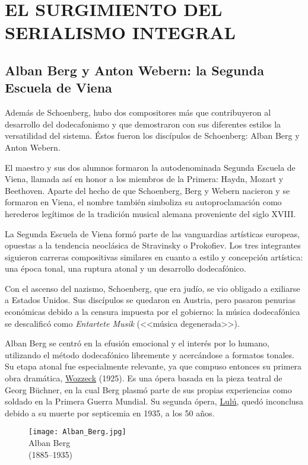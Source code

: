 \section{EL SURGIMIENTO DEL SERIALISMO INTEGRAL}\label{ch:serialismo}
	\subsection{Alban Berg y Anton Webern: la Segunda Escuela de Viena}
	\label{berweb}
	Además de Schoenberg, hubo dos compositores más que contribuyeron al desarrollo del dodecafonismo y que demostraron con sus diferentes estilos la versatilidad del sistema. Éstos fueron los discípulos de Schoenberg: Alban Berg y Anton Webern. 
	
	El maestro y sus dos alumnos formaron la autodenominada Segunda Escuela de Viena, llamada así en honor a los miembros de la Primera: Haydn, Mozart y Beethoven. Aparte del hecho de que Schoenberg, Berg y Webern nacieron y se formaron en Viena, el nombre también simboliza su autoproclamación como herederos legítimos de la tradición musical alemana proveniente del siglo XVIII.
	
	La Segunda Escuela de Viena formó parte de las vanguardias artísticas europeas, opuestas a la tendencia neoclásica de Stravinsky o Prokofiev. Los tres integrantes siguieron carreras compositivas similares en cuanto a estilo y concepción artística: una época tonal, una ruptura atonal y un desarrollo dodecafónico.
	
	Con el ascenso del nazismo, Schoenberg, que era judío, se vio obligado a exiliarse a Estados Unidos. Sus discípulos se quedaron en Austria, pero pasaron penurias económicas debido a la censura impuesta por el gobierno: la música dodecafónica se descalificó como \emph{Entartete Musik} (<<música degenerada>>).
	
	Alban Berg se centró en la efusión emocional y el interés por lo humano, utilizando el método dodecafónico libremente y acercándose a formatos tonales. Su etapa atonal fue especialmente relevante, ya que compuso entonces su primera obra dramática, \href{https://www.youtube.com/watch?v=rHFFPyU41_0}{Wozzeck} (1925). Es una ópera basada en la pieza teatral de Georg Büchner, en la cual Berg plasmó parte de sus propias experiencias como soldado en la Primera Guerra Mundial. Su segunda ópera, \href{https://www.youtube.com/watch?v=bLuLsFjnCjI}{Lulú}, quedó inconclusa debido a su muerte por septicemia en 1935, a los 50 años.
	
	\begin{figure}[h]
		\begin{center}
			\texttt{[image: Alban\_Berg.jpg]}\\		
			{Alban Berg\\(1885--1935)}
		\end{center}
	\end{figure}
	
